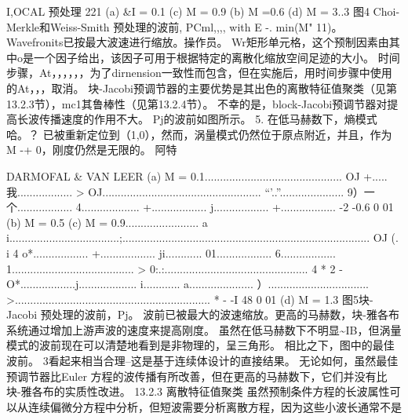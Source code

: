 \documentclass[UTF8,11pt,a4paper,openany,fontset=fandol]{ctexbook}
\begin{document}
I,OCAL 预处理 221 (a) \&I = 0.1 (c) M = 0.9 (b) M =0.6 (d) M = 3..3 图4 Choi-Merkle和Weiss-Smith 预处理的波前, PCml,,,, with E -. min(M" 11)。 Wavefronits已按最大波速进行缩放。操作员。 Wr矩形单元格，这个预制因素由其中o是一个因子给出，该因子可用于根据特定的离散化缩放空间足迹的大小。 时间步骤，At，，，，，，为了dirnension一致性而包含，但在实施后，用时间步骤中使用的At，，，取消。 块-Jacobi预调节器的主要优势是其出色的离散特征值聚类（见第13.2.3节），mc1其鲁棒性（见第13.2.4节）。 不幸的是，block-Jacobi预调节器对提高长波传播速度的作用不大。 Pj的波前如图所示。 5. 在低马赫数下，熵模式哈。？ 已被重新定位到（1,0），然而，涡量模式仍然位于原点附近，并且，作为M -+ 0，刚度仍然是无限的。 阿特

DARMOFAL \& VAN LEER (a) M = 0.1............................................. OJ +..... 我.................. > OJ.................................................... “'..”..................... 9）一个.................. 4................... +.................. j.................. +.................. -2 -0.6 0 01 (b) M = 0.5 (c) M = 0.9........................ a i....................................;................................................................................. OJ (. i 4 o*.................. +.................. ji............ 01.................. 6.................. 1........................................ > 0:.:............................................... 4 * 2 -O*..................j................... i............ a..................... ）................................. >................................................................ * - -I 48 0 01 (d) M = 1.3 图5块-Jacobi 预处理的波前，Pj。 波前已被最大的波速缩放。更高的马赫数，块-雅各布系统通过增加上游声波的速度来提高刚度。 虽然在低马赫数下不明显\textasciitilde{}IB，但涡量模式的波前现在可以清楚地看到是非物理的，呈三角形。 相比之下，图中的最佳波前。 3看起来相当合理--这是基于连续体设计的直接结果。 无论如何，虽然最佳预调节器比Euler 方程的波传播有所改善，但在更高的马赫数下，它们并没有比块-雅各布的实质性改进。 13.2.3 离散特征值聚类 虽然预制条件方程的长波属性可以从连续偏微分方程中分析，但短波需要分析离散方程，因为这些小波长通常不是
\end{document}

